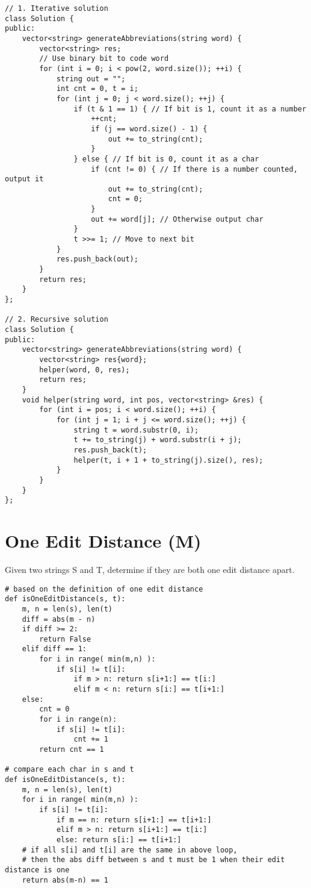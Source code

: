 \begin{lstlisting}
// 1. Iterative solution
class Solution {
public:
    vector<string> generateAbbreviations(string word) {
        vector<string> res;
        // Use binary bit to code word
        for (int i = 0; i < pow(2, word.size()); ++i) {
            string out = "";
            int cnt = 0, t = i;
            for (int j = 0; j < word.size(); ++j) {
                if (t & 1 == 1) { // If bit is 1, count it as a number
                    ++cnt;
                    if (j == word.size() - 1) {
                        out += to_string(cnt);
                    }
                } else { // If bit is 0, count it as a char
                    if (cnt != 0) { // If there is a number counted, output it
                        out += to_string(cnt);
                        cnt = 0;
                    }
                    out += word[j]; // Otherwise output char
                }
                t >>= 1; // Move to next bit
            }
            res.push_back(out);
        }
        return res;
    }
};

// 2. Recursive solution
class Solution {
public:
    vector<string> generateAbbreviations(string word) {
        vector<string> res{word};
        helper(word, 0, res);
        return res;
    }
    void helper(string word, int pos, vector<string> &res) {
        for (int i = pos; i < word.size(); ++i) {
            for (int j = 1; i + j <= word.size(); ++j) {
                string t = word.substr(0, i);
                t += to_string(j) + word.substr(i + j);
                res.push_back(t);
                helper(t, i + 1 + to_string(j).size(), res);
            }
        }
    }
};
\end{lstlisting}


\section{One Edit Distance (M)}
Given two strings S and T, determine if they are both one edit distance apart.\\

\begin{lstlisting}
# based on the definition of one edit distance
def isOneEditDistance(s, t):
	m, n = len(s), len(t)
	diff = abs(m - n)
	if diff >= 2: 
		return False
	elif diff == 1:
		for i in range( min(m,n) ):
			if s[i] != t[i]:
				if m > n: return s[i+1:] == t[i:]
				elif m < n: return s[i:] == t[i+1:]
	else:
		cnt = 0
		for i in range(n):
			if s[i] != t[i]:
				cnt += 1
		return cnt == 1

# compare each char in s and t
def isOneEditDistance(s, t):
	m, n = len(s), len(t)
	for i in range( min(m,n) ):
		if s[i] != t[i]:
			if m == n: return s[i+1:] == t[i+1:]
			elif m > n: return s[i+1:] == t[i:]
			else: return s[i:] == t[i+1:]
	# if all s[i] and t[i] are the same in above loop,
	# then the abs diff between s and t must be 1 when their edit distance is one
	return abs(m-n) == 1
\end{lstlisting}

